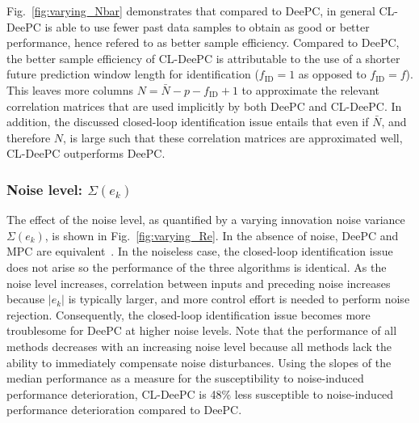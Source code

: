 Fig.~\ref{fig:varying_Nbar} demonstrates that compared to \ac{DeePC}, in general \ac{CL-DeePC} is able to use fewer past data samples to obtain as good or better performance, hence refered to as better sample efficiency. Compared to \ac{DeePC}, the better sample efficiency of \ac{CL-DeePC} is attributable to the use of a shorter future prediction window length for identification ($f_\mathrm{ID}=1$ as opposed to $f_\mathrm{ID}=f$). This leaves more columns $N=\bar{N}-p-f_\mathrm{ID}+1$ to approximate the relevant correlation matrices that are used implicitly by both \ac{DeePC} and \ac{CL-DeePC}. In addition, the discussed closed-loop identification issue entails that even if $\bar{N}$, and therefore $N$, is large such that these correlation matrices are approximated well, \ac{CL-DeePC} outperforms \ac{DeePC}.

\subsubsection{Noise level: $\Sigma(e_k)$}
\noindent The effect of the noise level, as quantified by a varying innovation noise variance $\Sigma(e_k)$, is shown in Fig.~\ref{fig:varying_Re}. In the absence of noise, \ac{DeePC} and \ac{MPC} are equivalent~\cite{Coulson2019}. In the noiseless case, the closed-loop identification issue does not arise so the performance of the three algorithms is identical. As the noise level increases, correlation between inputs and preceding noise increases because $|e_k|$ is typically larger, and more control effort is needed to perform noise rejection. Consequently, the closed-loop identification issue becomes more troublesome for \ac{DeePC} at higher noise levels. Note that the performance of all methods decreases with an increasing noise level because all methods lack the ability to immediately compensate noise disturbances. Using the slopes of the median performance as a measure for the susceptibility to noise-induced performance deterioration, \ac{CL-DeePC} is 48\% less susceptible to noise-induced performance deterioration compared to \ac{DeePC}.%
